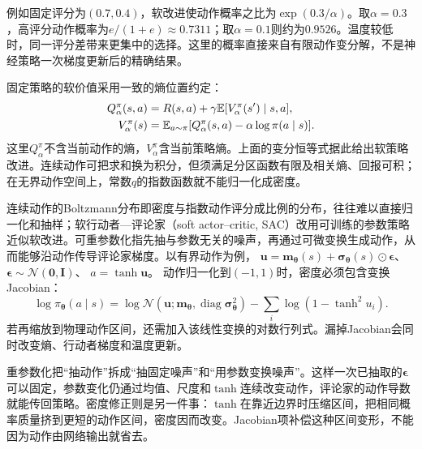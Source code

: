 例如固定评分为$(0.7,0.4)$，软改进使动作概率之比为$\exp(0.3/\alpha)$。取$\alpha=0.3$，高评分动作概率为$e/(1+e)\approx0.7311$；取$\alpha=0.1$则约为$0.9526$。温度较低时，同一评分差带来更集中的选择。这里的概率直接来自有限动作变分解，不是神经策略一次梯度更新后的精确结果。

固定策略的软价值采用一致的熵位置约定：
\begin{align}
  Q_\alpha^\pi(s,a)
    &=R(s,a)+\gamma\mathbb E[V_\alpha^\pi(s')\mid s,a],
       \notag\\
  V_\alpha^\pi(s)
    &=\mathbb E_{a\sim\pi}
        [Q_\alpha^\pi(s,a)-\alpha\log\pi(a\mid s)].
  \label{eq:rl-learning-soft-bellman}
\end{align}
这里$Q_\alpha^\pi$不含当前动作的熵，$V_\alpha^\pi$含当前策略熵。上面的变分恒等式据此给出软策略改进。连续动作可把求和换为积分，但须满足分区函数有限及相关熵、回报可积；在无界动作空间上，常数$q$的指数函数就不能归一化成密度。

连续动作的Boltzmann分布即密度与指数动作评分成比例的分布，往往难以直接归一化和抽样；软行动者—评论家（soft actor--critic, SAC）改用可训练的参数策略近似软改进。可重参数化指先抽与参数无关的噪声，再通过可微变换生成动作，从而能够沿动作传导评论家梯度。以有界动作为例，
$\bm u=\bm m_{\bm\theta}(s)+\bm\sigma_{\bm\theta}(s)\odot\bm\epsilon$、
$\bm\epsilon\sim\mathcal N(\bm0,\bm I)$、
$a=\tanh\bm u$。
动作归一化到$(-1,1)$时，密度必须包含变换Jacobian：
\[
  \log\pi_{\bm\theta}(a\mid s)
    =\log\mathcal N(\bm u;\bm m_{\bm\theta},
                           \operatorname{diag}\bm\sigma_{\bm\theta}^2)
       -\sum_i\log(1-\tanh^2u_i).
\]
若再缩放到物理动作区间，还需加入该线性变换的对数行列式。漏掉Jacobian会同时改变熵、行动者梯度和温度更新。

重参数化把“抽动作”拆成“抽固定噪声”和“用参数变换噪声”。这样一次已抽取的$\bm\epsilon$可以固定，参数变化仍通过均值、尺度和$\tanh$连续改变动作，评论家的动作导数就能传回策略。密度修正则是另一件事：$\tanh$在靠近边界时压缩区间，把相同概率质量挤到更短的动作区间，密度因而改变。Jacobian项补偿这种区间变形，不能因为动作由网络输出就省去。

